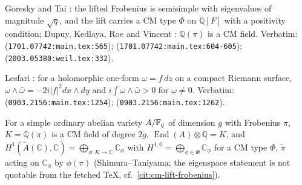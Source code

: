 \begin{citedfact}
\label{cit:cm-lift-frobenius}
Goresky and Tai \cite{goreskytai2017ordinary}: the lifted Frobenius is semisimple with
eigenvalues of magnitude $\sqrt q$, and the lift carries a CM type $\Phi$ on $\mathbb Q[F]$ with %
a positivity condition; Dupuy, Kedlaya, Roe and Vincent \cite{dupuy2020lmfdb}: $\mathbb Q(\pi)$ is
a CM field.
Verbatim: \texttt{}
(\texttt{1701.07742:main.tex:565}); \texttt{}
(\texttt{1701.07742:main.tex:604-605}); \texttt{}
(\texttt{2003.05380:weil.tex:332}).
\end{citedfact}

\begin{citedfact}
\label{cit:hodge-positive-forms}
Lesfari \cite{lesfari2009surfaces}: for a holomorphic one-form $\omega = f\,dz$ on a compact
Riemann surface, $\omega\wedge\bar\omega = -2i|f|^2dx\wedge dy$ and $i\int\omega\wedge\bar\omega>0$
for $\omega\ne0$.
Verbatim: \texttt{} (\texttt{0903.2156:main.tex:1254});
\texttt{} (\texttt{0903.2156:main.tex:1262}).
\end{citedfact}

\begin{assumption}
\label{asm:cm-hodge-type}
For a simple ordinary abelian variety $A/\mathbb F_q$ of dimension $g$ with Frobenius $\pi$,
$K = \mathbb Q(\pi)$ is a CM field of degree $2g$, $\operatorname{End}(A)\otimes\mathbb Q = K$, and
$H^1(\tilde A(\mathbb C),\mathbb C) = \bigoplus_{\phi\colon K\to\mathbb C}\mathbb C_\phi$ with
$H^{1,0} = \bigoplus_{\phi\in\Phi}\mathbb C_\phi$ for a CM type $\Phi$, $\tilde\pi$ acting on %
$\mathbb C_\phi$ by $\phi(\pi)$ (Shimura--Taniyama; the eigenspace statement is not quotable from
the fetched TeX, cf.\ \cref{cit:cm-lift-frobenius}).
\end{assumption}

